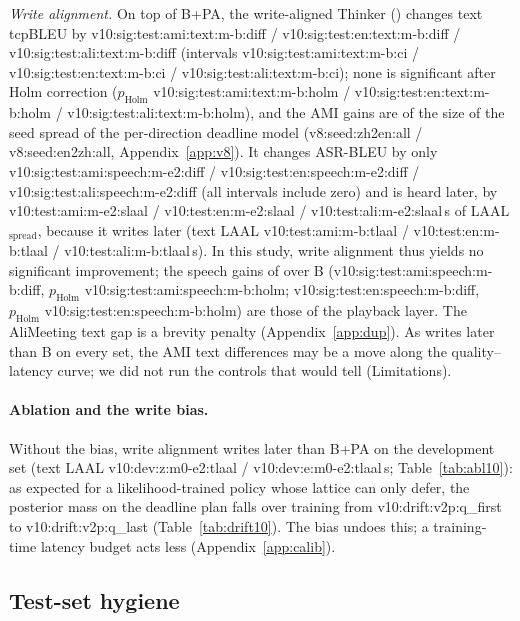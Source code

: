 \emph{Write alignment.} On top of B+PA, the write-aligned Thinker (\sys{}) changes text tcpBLEU by
\num{v10:sig:test:ami:text:m-b:diff} / \num{v10:sig:test:en:text:m-b:diff} / \num{v10:sig:test:ali:text:m-b:diff}
(intervals \num{v10:sig:test:ami:text:m-b:ci} / \num{v10:sig:test:en:text:m-b:ci} / \num{v10:sig:test:ali:text:m-b:ci});
none is significant after Holm correction ($p_\text{Holm}$ \num{v10:sig:test:ami:text:m-b:holm} /
\num{v10:sig:test:en:text:m-b:holm} / \num{v10:sig:test:ali:text:m-b:holm}), and the AMI gains are of the size of the
seed spread of the per-direction deadline model (\num{v8:seed:zh2en:all} / \num{v8:seed:en2zh:all},
Appendix~\ref{app:v8}). It changes ASR-BLEU by only \num{v10:sig:test:ami:speech:m-e2:diff} /
\num{v10:sig:test:en:speech:m-e2:diff} / \num{v10:sig:test:ali:speech:m-e2:diff} (all intervals include zero) and is
heard later, by \num{v10:test:ami:m-e2:slaal} / \num{v10:test:en:m-e2:slaal} / \num{v10:test:ali:m-e2:slaal}\,s of
LAAL$_\text{spread}$, because it writes later (text LAAL \num{v10:test:ami:m-b:tlaal} /
\num{v10:test:en:m-b:tlaal} / \num{v10:test:ali:m-b:tlaal}\,s). In this study, write alignment thus yields no
significant improvement; the speech gains of \sys{} over B (\num{v10:sig:test:ami:speech:m-b:diff},
$p_\text{Holm}$ \num{v10:sig:test:ami:speech:m-b:holm}; \num{v10:sig:test:en:speech:m-b:diff}, $p_\text{Holm}$
\num{v10:sig:test:en:speech:m-b:holm}) are those of the playback layer. The AliMeeting text gap is a brevity penalty
(Appendix~\ref{app:dup}). As \sys{} writes later than B on every set, the AMI text differences may be a move along the
quality--latency curve; we did not run the controls that would tell (Limitations).

\paragraph{Ablation and the write bias.}
\label{sec:res-drift}
Without the bias, write alignment writes later than B+PA on the development set (text LAAL
\num{v10:dev:z:m0-e2:tlaal} / \num{v10:dev:e:m0-e2:tlaal}\,s; Table~\ref{tab:abl10}): as expected for a
likelihood-trained policy whose lattice can only defer, the posterior mass on the deadline plan falls over training from
\num{v10:drift:v2p:q_first} to \num{v10:drift:v2p:q_last} (Table~\ref{tab:drift10}). The bias undoes this; a
training-time latency budget acts less (Appendix~\ref{app:calib}).

\subsection{Test-set hygiene}
\label{sec:res-hygiene}

